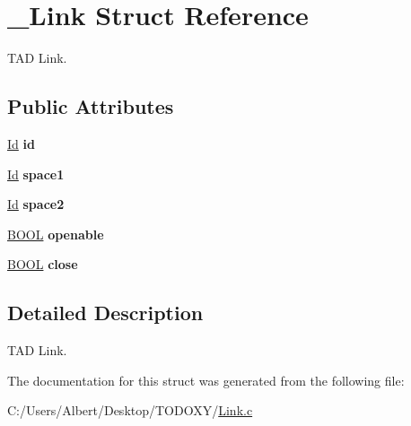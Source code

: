 \hypertarget{struct___link}{\section{\-\_\-\-Link Struct Reference}
\label{struct___link}
}


T\-A\-D Link.  


\subsection*{Public Attributes}
\begin{DoxyCompactItemize}
\item 
\hypertarget{struct___link_a151212e7a8e8274c2a1ee991ba95878b}{\hyperlink{_types_8h_a845e604fb28f7e3d97549da3448149d3}{Id} {\bfseries id}}\label{struct___link_a151212e7a8e8274c2a1ee991ba95878b}

\item 
\hypertarget{struct___link_aabaabaea67e2e626e413fab3324087ff}{\hyperlink{_types_8h_a845e604fb28f7e3d97549da3448149d3}{Id} {\bfseries space1}}\label{struct___link_aabaabaea67e2e626e413fab3324087ff}

\item 
\hypertarget{struct___link_aa526fe717007b3865bf2bd7b9dd0655d}{\hyperlink{_types_8h_a845e604fb28f7e3d97549da3448149d3}{Id} {\bfseries space2}}\label{struct___link_aa526fe717007b3865bf2bd7b9dd0655d}

\item 
\hypertarget{struct___link_a0acb167798b0e967caa5deb81ff5970b}{\hyperlink{_types_8h_a3e5b8192e7d9ffaf3542f1210aec18dd}{B\-O\-O\-L} {\bfseries openable}}\label{struct___link_a0acb167798b0e967caa5deb81ff5970b}

\item 
\hypertarget{struct___link_ac38ff420d1ca240f0da9e75f8c3a9e1d}{\hyperlink{_types_8h_a3e5b8192e7d9ffaf3542f1210aec18dd}{B\-O\-O\-L} {\bfseries close}}\label{struct___link_ac38ff420d1ca240f0da9e75f8c3a9e1d}

\end{DoxyCompactItemize}


\subsection{Detailed Description}
T\-A\-D Link. 


\begin{DoxyItemize}
\item 
\end{DoxyItemize}

The documentation for this struct was generated from the following file\-:\begin{DoxyCompactItemize}
\item 
C\-:/\-Users/\-Albert/\-Desktop/\-T\-O\-D\-O\-X\-Y/\hyperlink{_link_8c}{Link.\-c}\end{DoxyCompactItemize}
